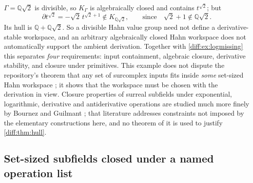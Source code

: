 \documentclass[11pt,letterpaper]{article}
\numberwithin{equation}{section}
\theoremstyle{definition}
\theoremstyle{remark}
\newcommand{\Q}{\mathbb Q}
\newcommand{\der}{\partial}
\begin{document}
\begin{example}
\label{diff:ex:sqrt2}
$\Gamma=\Q\sqrt2$ is divisible, so $K_{\Gamma}$ is algebraically closed and
contains $t^{\sqrt2}$; but
\[
 \der t^{\sqrt2}=-\sqrt2\,t^{\sqrt2+1}\notin K_{\Q\sqrt2},
 \qquad\text{since}\quad \sqrt2+1\notin\Q\sqrt2 .
\]
Its hull is $\Q+\Q\sqrt2$. So a divisible Hahn value group need not define a
derivative-stable workspace, and an arbitrary algebraically closed Hahn
workspace does not automatically support the ambient derivation. Together with
\cref{diff:ex:logmissing} this separates \emph{four} requirements: input
containment, algebraic closure, derivative stability, and closure under
primitives. This example does not dispute the repository's theorem that any set
of surcomplex inputs fits inside \emph{some} set-sized Hahn workspace
\cite{RepoFound}; it shows that the workspace must be chosen with the
derivation in view. Closure properties of surreal subfields under exponential,
logarithmic, derivative and antiderivative operations are studied much more
finely by Bournez and Guilmant \cite{BG}; that literature addresses constraints
not imposed by the elementary constructions here, and no theorem of it is used
to justify \cref{diff:thm:hull}.
\end{example}

\subsection{Set-sized subfields closed under a named operation list}
\label{diff:sub:subfieldclosure}
\end{document}
